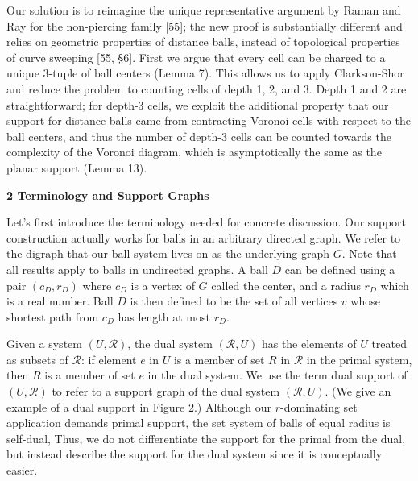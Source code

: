 \documentclass[10pt,a4paper]{article}
\begin{document}
\par
\par
Our solution is to reimagine the unique representative argument by Raman and Ray for the non-piercing family [55]; the new proof is substantially different and relies on geometric properties of distance balls, instead of topological properties of curve sweeping [55, §6]. First we argue that every cell can be charged to a unique 3-tuple of ball centers (Lemma 7). This allows us to apply Clarkson-Shor and reduce the problem to counting cells of depth 1, 2, and 3. Depth 1 and 2 are straightforward; for depth-3 cells, we exploit the additional property that our support for distance balls came from contracting Voronoi cells with respect to the ball centers, and thus the number of depth-3 cells can be counted towards the complexity of the Voronoi diagram, which is asymptotically the same as the planar support (Lemma 13).
\par
\par
\par\medskip\noindent\textbf{2 Terminology and Support Graphs}\par
Let’s first introduce the terminology needed for concrete discussion. Our support construction actually works for balls in an arbitrary directed graph. We refer to the digraph that our ball system lives on as the underlying graph $G$. Note that all results apply to balls in undirected graphs. A ball $D$ can be defined using a pair $(c_{D},r_{D})$ where $c_{D}$ is a vertex of $G$ called the center, and a radius $r_{D}$ which is a real number. Ball $D$ is then defined to be the set of all vertices $v$ whose shortest path from $c_{D}$ has length at most $r_{D}$.
\par
\par
Given a system $(U,\mathcal{R})$, the dual system $(\mathcal{R},U)$ has the elements of $U$ treated as subsets of $\mathcal{R}$: if element $e$ in $U$ is a member of set $R$ in $\mathcal{R}$ in the primal system, then $R$ is a member of set $e$ in the dual system. We use the term dual support of $(U,\mathcal{R})$ to refer to a support graph of the dual system $(\mathcal{R},U)$. (We give an example of a dual support in Figure 2.) Although our $r$-dominating set application demands primal support, the set system of balls of equal radius is self-dual, Thus, we do not differentiate the support for the primal from the dual, but instead describe the support for the dual system since it is conceptually easier.
\end{document}
